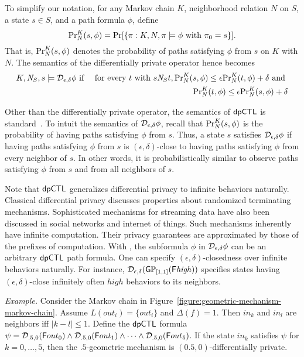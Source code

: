 To simplify our notation, for any Markov chain $K$, neighborhood
relation $N$ on $S$, a state $s \in S$, and a path formula $\phi$,
define
\[
\myPr{s}{K}{N}{\phi} =
\Pr [ \{ \pi : K, N, \pi \models \phi \textmd{ with } \pi_0 = s \} ].
\]
That is, $\myPr{s}{K}{N}{\phi}$ denotes the probability of paths
satisfying $\phi$ from $s$ on $K$ with $N$. The semantics of the
differentially private operator hence becomes
\begin{eqnarray*}
  K, \neighbor{S}, s \models \dpriv{\epsilon}{\delta} \phi
  & \textmd{ if } & 
  \textmd{for every } t \textmd{ with }  s \neighbor{S} t,
      \myPr{s}{K}{N}{\phi} \leq \epsilon \myPr{t}{K}{N}{\phi} + \delta 
      \textmd{ and }\\
  & &  \myPr{t}{K}{N}{\phi} \leq \epsilon \myPr{s}{K}{N}{\phi} + \delta
\end{eqnarray*}

Other than the differentially private operator, the semantics of
$\dpCTL$ is standard~\cite{BK:08:PMC}. 
To intuit the semantics of $\dpriv{\epsilon}{\delta} \phi$, 
recall that  $\myPr{s}{K}{N}{\phi}$ is the probability of having
paths satisfying $\phi$ from $s$. Thus, a state $s$ satisfies 
$\dpriv{\epsilon}{\delta} \phi$ if having paths satisfying $\phi$
from $s$ is $(\epsilon, \delta)$-close to having paths satisfying
$\phi$ from every neighbor of $s$. In other words, it is
probabilistically similar to observe paths satisfying $\phi$ from $s$
and from all neighbors of $s$.

Note that $\dpCTL$ generalizes differential privacy to infinite
behaviors naturally. Classical differential privacy discusses properties about
randomized terminating mechanisms. Sophisticated mechanisms for
streaming data have also been discussed in social networks and
internet of things. Such mechanisms inherently have infinite
computation. Their privacy guarantees are approximated by those of the 
prefixes of computation.
With \dpCTL, the subformula $\phi$ in $\dpriv{\epsilon}{\delta} \phi$
can be an arbitrary $\dpCTL$ path formula. One can specify
$(\epsilon, \delta)$-closedness over infinite behaviors naturally. For instance,
$\dpriv{\epsilon}{\delta} (\G \PJ{[1,1]} (\F \mathit{high}))$
specifies states having $(\epsilon, \delta)$-close 
infinitely often $\mathit{high}$ behaviors to its neighbors. 

\noindent
\textit{Example.} 
Consider the Markov chain in
Figure~\ref{figure:geometric-mechanism-markov-chain}. Assume 
$L(out_i) = \{ out_i \}$ and $\Delta (f) = 1$. Then $in_k$ and $in_l$ are
neighbors iff $| k - l | \leq 1$. Define the $\dpCTL$ formula
$\psi = \dpriv{.5}{0} (\F out_0) \wedge \dpriv{.5}{0} (\F out_1) \wedge
\cdots \wedge \dpriv{.5}{0} (\F out_5)$. If the state $in_k$ satisfies
$\psi$ for $k = 0, \ldots, 5$, then the $.5$-geometric mechanism is
$(0.5, 0)$-differentially private.

